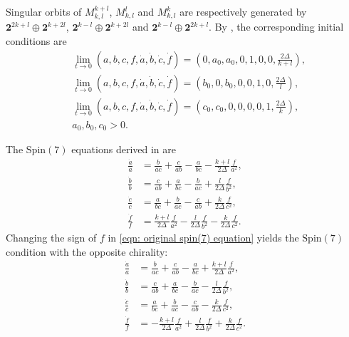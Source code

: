 \documentclass[11pt,letterpaper]{amsart}
\theoremstyle{definition}
\numberwithin{equation}{section}
\newcommand{\spin}{\mathrm{Spin}}
\begin{document}
Singular orbits of $M_{k,l}^{k+l}$, $M_{k,l}^{l}$ and $M_{k,l}^{k}$ are respectively generated by $\mathbf{2}^{2k+l}\oplus \mathbf{2}^{k+2l}$, $\mathbf{2}^{k-l}\oplus \mathbf{2}^{k+2l}$ and $\mathbf{2}^{k-l}\oplus \mathbf{2}^{2k+l}$. By \cite{eschenburg_initial_2000, reidegeld2011exceptional}, the corresponding initial conditions are
\begin{equation}
\label{eqn: initial condtion}
\begin{split}
& \lim_{t\to 0}(a,b,c,f,\dot{a},\dot{b},\dot{c},\dot{f})=\left(0,a_0,a_0,0,1,0,0,\frac{2\Delta}{k+l}\right),\\
& \lim_{t\to 0}(a,b,c,f,\dot{a},\dot{b},\dot{c},\dot{f})=\left(b_0,0,b_0,0,0,1,0,\frac{2\Delta}{l}\right),\\
& \lim_{t\to 0}(a,b,c,f,\dot{a},\dot{b},\dot{c},\dot{f})=\left(c_0,c_0,0,0,0,0,1,\frac{2\Delta}{k}\right),\\
& a_0, b_0, c_0>0.
\end{split}
\end{equation}

The $\spin(7)$ equations derived in \cite{reidegeld2011exceptional} are
\begin{equation}
\label{eqn: original spin(7) equation}
\begin{split}
\frac{\dot{a}}{a}&=\frac{b}{ac}+\frac{c}{ab}-\frac{a}{bc}-\frac{k+l}{2\Delta}\frac{f}{a^2},\\
\frac{\dot{b}}{b}&=\frac{c}{ab}+\frac{a}{bc}-\frac{b}{ac}+\frac{l}{2\Delta}\frac{f}{b^2},\\
\frac{\dot{c}}{c}&=\frac{a}{bc}+\frac{b}{ac}-\frac{c}{ab}+\frac{k}{2\Delta}\frac{f}{c^2},\\
\frac{\dot{f}}{f}&=\frac{k+l}{2\Delta}\frac{f}{a^2}-\frac{l}{2\Delta}\frac{f}{b^2}-\frac{k}{2\Delta}\frac{f}{c^2}.
\end{split}
\end{equation}
Changing the sign of $f$ in \eqref{eqn: original spin(7) equation} yields the $\spin(7)$ condition with the opposite chirality:
\begin{equation}
\label{eqn: original opposite spin(7) equation}
\begin{split}
\frac{\dot{a}}{a}&=\frac{b}{ac}+\frac{c}{ab}-\frac{a}{bc}+\frac{k+l}{2\Delta}\frac{f}{a^2},\\
\frac{\dot{b}}{b}&=\frac{c}{ab}+\frac{a}{bc}-\frac{b}{ac}-\frac{l}{2\Delta}\frac{f}{b^2},\\
\frac{\dot{c}}{c}&=\frac{a}{bc}+\frac{b}{ac}-\frac{c}{ab}-\frac{k}{2\Delta}\frac{f}{c^2},\\
\frac{\dot{f}}{f}&=-\frac{k+l}{2\Delta}\frac{f}{a^2}+\frac{l}{2\Delta}\frac{f}{b^2}+\frac{k}{2\Delta}\frac{f}{c^2}.
\end{split}
\end{equation}
\end{document}
